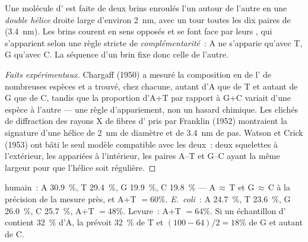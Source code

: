 \begin{proposition}\label{prop:g10:universal-dna:helix}
Une molécule d' est faite de deux brins enroulés l'un autour de
l'autre en une \emph{double hélice} droite large
d'environ \qty{2}{nm}, avec un tour toutes les dix paires de 
(\qty{3.4}{nm}). Les brins courent en sens opposés et se font face par
leurs , qui s'apparient selon une règle stricte de
\emph{complémentarité}~: A ne s'apparie qu'avec
T, G qu'avec C. La séquence d'un brin fixe donc celle de l'autre.
\end{proposition}
\begin{proof}[Faits expérimentaux]
Chargaff (1950) a mesuré la composition en  de l' de nombreuses
espèces et a trouvé, chez chacune, autant d'A que de T et autant de G
que de C, tandis que la proportion d'A+T par rapport à G+C variait
d'une espèce à l'autre --- une règle d'appariement, non un hasard
chimique. Les clichés de diffraction des rayons X de fibres d' pris
par Franklin (1952) montraient la signature d'une hélice de
\qty{2}{nm} de diamètre et de \qty{3.4}{nm} de pas. Watson et Crick
(1953) ont bâti le seul modèle compatible avec les deux~: deux
squelettes à l'extérieur, les  appariées à l'intérieur, les paires
A--T et G--C ayant la même largeur pour que l'hélice soit régulière.
\end{proof}

\begin{example}\label{ex:g10:universal-dna:chargaff}
 humain~: A 30.9~\%, T 29.4~\%, G 19.9~\%, C 19.8~\% ---
A$\,\approx\,$T et G$\,\approx\,$C à la précision de la mesure près, et
A+T $= 60\%$. \emph{E.~coli}~: A 24.7~\%, T 23.6~\%, G 26.0~\%, C
25.7~\%, A+T $= 48\%$. Levure~: A+T $= 64\%$. Si un échantillon d'
contient 32~\% d'A, la  prévoit 32~\% de T et
$(100 - 64)/2 = 18\%$ de G et autant de C.
\end{example}


